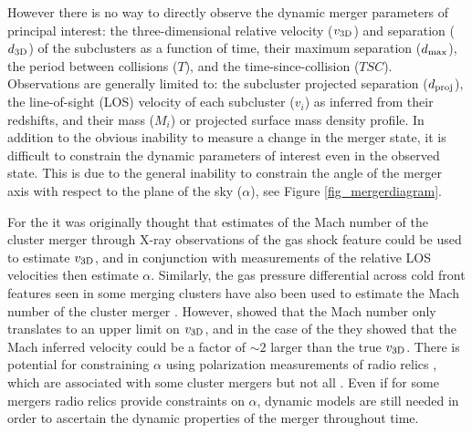 However there is no way to directly observe the dynamic merger parameters of principal interest: the three-dimensional relative velocity ($v_{\rm 3D}$) and separation ($d_{\rm 3D}$) of the subclusters as a function of time, their maximum separation ($d_{\rm max}$), the period between collisions ($T$), and the time-since-collision ($TSC$).
Observations are generally limited to: the subcluster projected separation ($d_{\rm proj}$), the line-of-sight (LOS) velocity of each subcluster ($v_i$) as inferred from their redshifts, and their mass ($M_i$) or projected surface mass density profile.
In addition to the obvious inability to measure a change in the merger state, it is difficult to constrain the dynamic parameters of interest even in the observed state. 
This is due to the general inability to constrain the angle of the merger axis with respect to the plane of the sky ($\alpha$), see Figure \ref{fig_mergerdiagram}.

For the  it was originally thought that estimates of the Mach number of the cluster merger through X-ray observations of the gas shock feature \citep[e.g.][]{Markevitch:2006wv} could be used to estimate $v_{\rm 3D}$, and in conjunction with measurements of the relative LOS velocities then estimate $\alpha$.
Similarly, the gas pressure differential across cold front features seen in some merging clusters have also been used to estimate the Mach number of the cluster merger \citep[e.g.][]{Vikhlinin:2003wy}. 
However, \citet{Springel:2007bg} showed that the Mach number only translates to an upper limit on $v_{\rm 3D}$, and in the case of the  they showed that the Mach inferred velocity could be a factor of $\sim2$ larger than the true $v_{\rm 3D}$.
There is potential for constraining $\alpha$ using polarization measurements of radio relics \citep{Ensslin:1998tx}, which are associated with some cluster mergers \citep[e.g.\,][]{vanWeeren:2010dn} but not all \citep[e.g.\,][]{Russell:2011hn}. 
Even if for some mergers radio relics provide constraints on $\alpha$, dynamic models are still needed in order to ascertain the dynamic properties of the merger throughout time.

